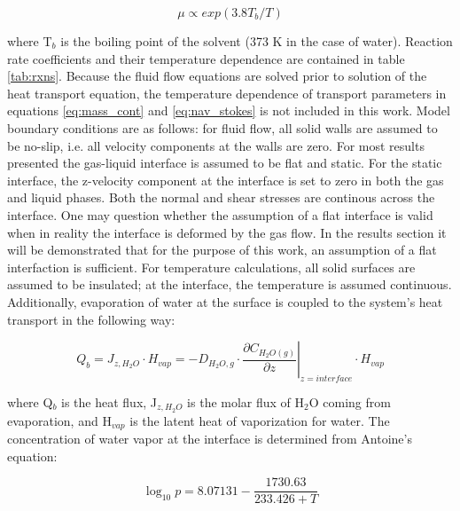 \documentclass[12pt]{article}
\begin{document}
\begin{equation}
	\mu \propto exp(3.8T_b/T)
	\label{eq:viscosityTempDependence}
\end{equation}

where T$_b$ is the boiling point of the solvent (373 K in the case of water). Reaction rate coefficients and their temperature dependence are contained in table \ref{tab:rxns}. Because the fluid flow equations are solved prior to solution of the heat transport equation, the temperature dependence of transport parameters in equations \ref{eq:mass_cont} and \ref{eq:nav_stokes} is not included in this work. Model boundary conditions are as follows: for fluid flow, all solid walls are assumed to be no-slip, i.e. all velocity components at the walls are zero. For most results presented the gas-liquid interface is assumed to be flat and static. For the static interface, the z-velocity component at the interface is set to zero in both the gas and liquid phases. Both the normal and shear stresses are continous across the interface. One may question whether the assumption of a flat interface is valid when in reality the interface is deformed by the gas flow. In the results section it will be demonstrated that for the purpose of this work, an assumption of a flat interfaction is sufficient. For temperature calculations, all solid surfaces are assumed to be insulated; at the interface, the temperature is assumed continuous. Additionally, evaporation of water at the surface is coupled to the system's heat transport in the following way: \cite{bird2007transport}

\begin{equation}
    Q_b = J_{z,H_2O}\cdot H_{vap} = -D_{H_2O,g}\cdot \left.\frac{\partial C_{H_2O(g)}}{\partial z}\right|_{z=interface}\cdot H_{vap}
    \label{eq:vapheatsrc}
\end{equation}

where Q$_b$ is the heat flux, J$_{z,H_2O}$ is the molar flux of H$_2$O coming from evaporation, and H$_{vap}$ is the latent heat of vaporization for water. The concentration of water vapor at the interface is determined from Antoine's equation: \cite{antoine1888thermodynamic}

\begin{equation}
    \log_{10}p = 8.07131 - \frac{1730.63}{233.426+T}
    \label{eq:Antoine}
\end{equation}
\end{document}
